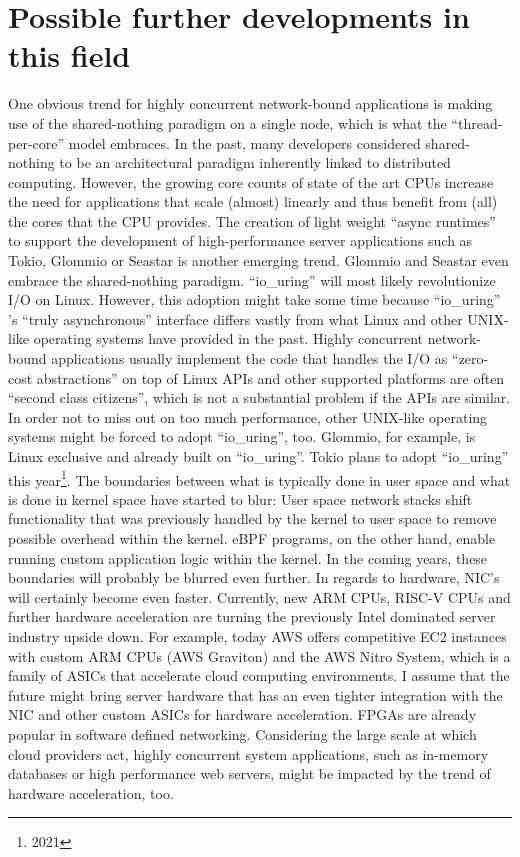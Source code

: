 \section{Possible further developments in this field}
One obvious trend for highly concurrent network-bound applications is making use of the shared-nothing paradigm on a single node, which is what the “thread-per-core” model embraces. In the past, many developers considered shared-nothing to be an architectural paradigm inherently linked to distributed computing. However, the growing core counts of state of the art CPUs increase the need for applications that scale (almost) linearly and thus benefit from (all) the cores that the CPU provides. \newline
The creation of light weight “async runtimes” to support the development of high-performance server applications such as Tokio, Glommio or Seastar is another emerging trend. Glommio and Seastar even embrace the shared-nothing paradigm.\newline
“io\_uring” will most likely revolutionize I/O on Linux. However, this adoption might take some time because “io\_uring” ’s “truly asynchronous” interface differs vastly from what Linux and other UNIX-like operating systems have provided in the past. Highly concurrent network-bound applications usually implement the code that handles the I/O as “zero-cost abstractions” on top of Linux APIs and other supported platforms are often “second class citizens”, which is not a substantial problem if the APIs are similar. In order not to miss out on too much performance, other UNIX-like operating systems might be forced to adopt “io\_uring”, too. Glommio, for example, is Linux exclusive and already built on “io\_uring”. Tokio plans to adopt “io\_uring” this year\footnote{2021}. \newline
The boundaries between what is typically done in user space and what is done in kernel space have started to blur: User space network stacks shift functionality that was previously handled by the kernel to user space to remove possible overhead within the kernel. eBPF programs, on the other hand, enable running custom application logic within the kernel. In the coming years, these boundaries will probably be blurred even further. \newline
In regards to hardware, NIC’s will certainly become even faster. Currently, new ARM CPUs, RISC-V CPUs and further hardware acceleration are turning the previously Intel dominated server industry upside down. For example, today AWS offers competitive EC2 instances with custom ARM CPUs (AWS Graviton) and the AWS Nitro System, which is a family of ASICs that accelerate cloud computing environments. I assume that the future might bring server hardware that has an even tighter integration with the NIC and other custom ASICs for hardware acceleration. FPGAs are already popular in software defined networking. Considering the large scale at which cloud providers act, highly concurrent system applications, such as in-memory databases or high performance web servers, might be impacted by the trend of hardware acceleration, too.
